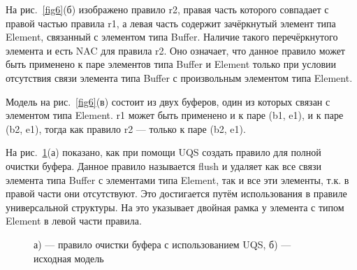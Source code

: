 \documentclass[a5paper]{article}
\begin{document}
На рис.~\ref{fig6}(б) изображено правило r2, правая часть которого совпадает с правой частью правила r1, а левая часть содержит зачёркнутый элемент типа Element, связанный с элементом типа Buffer. Наличие такого перечёркнутого элемента и есть NAC для правила r2. Оно означает, что данное правило может быть применено к паре элементов типа Buffer и Element только при условии отсутствия связи элемента типа Buffer с произвольным элементом типа Element.

Модель на рис.~\ref{fig6}(в) состоит из двух буферов, один из которых связан с элементом типа Element. r1 может быть применено и к паре (b1, e1), и к паре (b2, e1), тогда как правило r2 --- только к паре (b2, e1).

На рис.~\ref{fig7}(а) показано, как при помощи UQS создать правило для полной очистки буфера. Данное правило называется flush и удаляет как все связи элемента типа Buffer с элементами типа Element, так и все эти элементы, т.к. в правой части они отсутствуют. Это достигается путём использования в правиле универсальной структуры. На это указывает двойная рамка у элемента с типом Element в левой части правила.

\begin{figure}[h]
\begin{center}
\begin{minipage}[h]{0.8\linewidth}
\end{minipage}
\begin{minipage}[h]{0.8\linewidth}
\end{minipage}
\end{center}
\caption{а) --- правило очистки буфера с использованием UQS, б) — исходная модель}
\label{fig7}
\end{figure}
\end{document}
